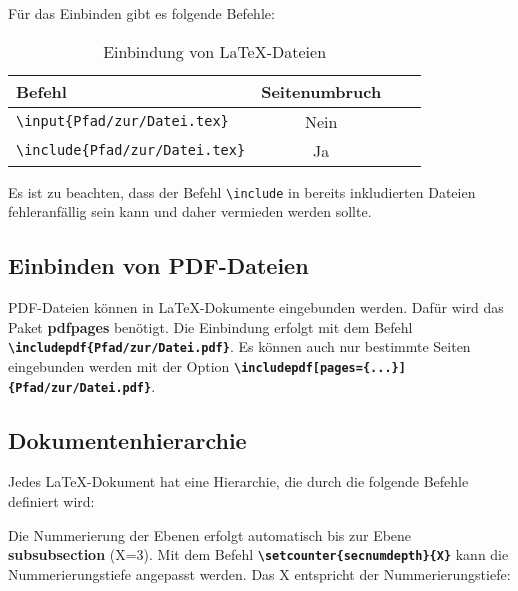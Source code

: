 Für das Einbinden gibt es folgende Befehle:
\begin{table}[H]
    \centering
    \begin{tabular}{lccc}
        \toprule
        \textbf{Befehl}                                       & \textbf{Seitenumbruch} \\
        \midrule
        \texttt{\textbackslash input\{Pfad/zur/Datei.tex\}}   & Nein                   \\
        \texttt{\textbackslash include\{Pfad/zur/Datei.tex\}} & Ja                     \\

        \bottomrule
    \end{tabular}
    \caption{Einbindung von \LaTeX{}-Dateien}
    \label{tab:latex_einbindung}
\end{table}

Es ist zu beachten, dass der Befehl \texttt{\textbackslash include} in bereits inkludierten Dateien fehleranfällig sein kann und daher vermieden werden sollte.


\subsection{Einbinden von PDF-Dateien}
\label{sec:einbinden_von_pdf_dateien}
PDF-Dateien können in \LaTeX{}-Dokumente eingebunden werden. Dafür wird das Paket \textbf{pdfpages} benötigt. Die Einbindung erfolgt mit dem Befehl \textbf{\texttt{\textbackslash includepdf\{Pfad/zur/Datei.pdf\}}}. Es können auch nur bestimmte Seiten eingebunden werden mit der Option \textbf{\texttt{\textbackslash includepdf[pages=\{...\}]\{Pfad/zur/Datei.pdf\}}}.


\subsection{Dokumentenhierarchie}
Jedes \LaTeX{}-Dokument hat eine Hierarchie, die durch die folgende Befehle definiert wird:


Die Nummerierung der Ebenen erfolgt automatisch bis zur Ebene \textbf{subsubsection} (X=3).
Mit dem Befehl \textbf{\texttt{\textbackslash setcounter\{secnumdepth\}\{X\}}} kann die Nummerierungstiefe angepasst werden. Das X entspricht der Nummerierungstiefe:

